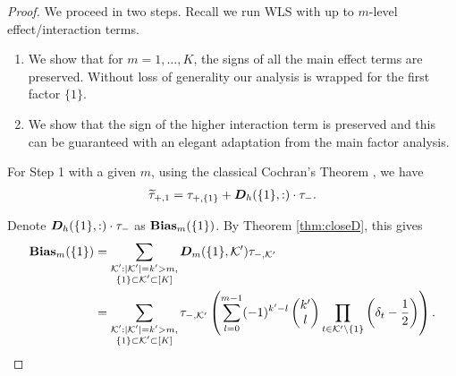 \documentclass[12pt]{article}
\begin{document}
\begin{proof}
We proceed in two steps. Recall we run WLS with up to $m$-level effect/interaction terms.
\begin{enumerate}
    \item We show that for $m=1,\dots, K$, the signs of all the main effect terms are preserved. Without loss of generality our analysis is wrapped for the first factor $\{1\}$. 
    \item We show that the sign of the higher interaction term is preserved and this can be guaranteed with an elegant adaptation from the main factor analysis.
\end{enumerate}

For Step 1 with a given $m$, using the classical Cochran's Theorem \citep{zhao2021regression}, we have 
\begin{align*}
    \widetilde{\tau}_{+,{1}} = \tau_{+,\{1\}} + {\boldsymbol{D}}_h(\{1\},:)\cdot\tau_-.
\end{align*}

Denote ${\boldsymbol{D}}_h(\{1\},:)\cdot\tau_-$ as $\text{\textbf{Bias}}_m(\{1\})$. By Theorem \ref{thm:closeD}, this gives
\begin{align*}
    \text{\textbf{Bias}}_m(\{1\}) &= \sum_{\substack{{\mathcal{K}}':|{\mathcal{K}}'|=k'>m, \\ \{1\}\subset {\mathcal{K}}'\subset [K]}} {\boldsymbol{D}}_m(\{1\}, {\mathcal{K}}') \tau_{-,{\mathcal{K}}'}\\
    &= \sum_{\substack{{\mathcal{K}}':|{\mathcal{K}}'|=k'>m, \\ \{1\}\subset {\mathcal{K}}'\subset [K]}} \tau_{-,{\mathcal{K}}'} \left(\sum_{l=0}^{m-1} (-1)^{k'-l} \begin{pmatrix}
    k' \\
    l
    \end{pmatrix}
    \prod_{t\in {\mathcal{K}}'\backslash \{1\}}\left(\delta_t-\frac{1}{2}\right)\right).
\end{align*}


\end{proof}
\end{document}
